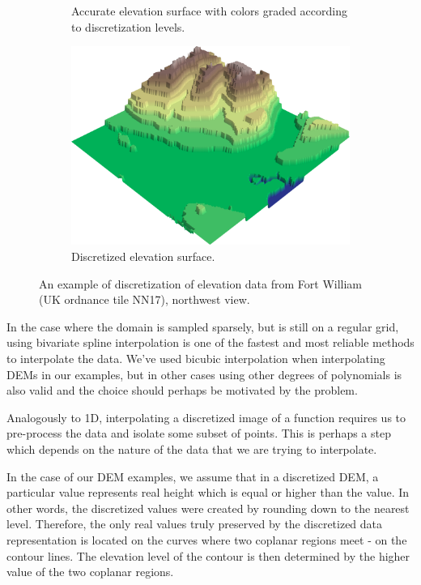 \documentclass[a4paper,10pt]{report}
\begin{document}
\begin{figure}[H]
\begin{subfigure}{.3\textwidth}
    \caption{Accurate elevation surface with colors graded according to discretization levels.}
    \end{subfigure}
    \hfill
    \begin{subfigure}{.3\textwidth}
        \includegraphics[width=1\textwidth]{../images/discretize/Discretized.png}
    \caption{Discretized elevation surface.}
    \end{subfigure}
    \caption{An example of discretization of elevation data from Fort William (UK ordnance tile NN17), northwest view.}
    \label{fig:3D_discrete_example}
\end{figure}

In the case where the domain is sampled sparsely, but is still on a regular grid, using bivariate spline interpolation is one of the fastest and most reliable methods to interpolate the data. We've used bicubic interpolation when interpolating DEMs in our examples, but in other cases using other degrees of polynomials is also valid and the choice should perhaps be motivated by the problem.

Analogously to 1D, interpolating a discretized image of a function requires us to pre-process the data and isolate some subset of points. This is perhaps a step which depends on the nature of the data that we are trying to interpolate.

In the case of our  DEM examples, we assume that in a discretized DEM, a particular value represents real height which is equal or higher than the value. In other words, the discretized values were created by rounding down to the nearest level. Therefore, the only real values truly preserved by the discretized data representation is located on the curves where two coplanar regions meet - on the contour lines. The elevation level of the contour is then determined by the higher value of the two coplanar regions.
\end{document}
